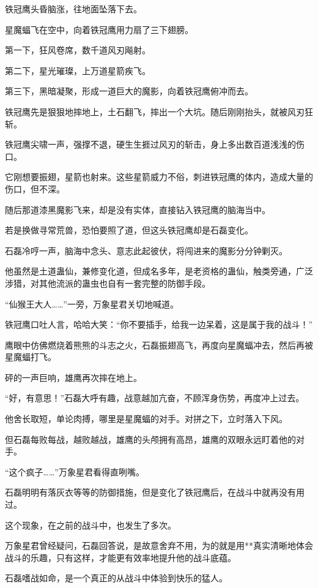 \begin{this_body}
铁冠鹰头昏脑涨，往地面坠落下去。

星魔蝠飞在空中，向着铁冠鹰用力扇了三下翅膀。

第一下，狂风卷席，数千道风刃飚射。

第二下，星光璀璨，上万道星箭疾飞。

第三下，黑暗凝聚，形成一道巨大的魔影，向着铁冠鹰俯冲而去。

铁冠鹰先是狠狠地摔地上，土石翻飞，摔出一个大坑。随后刚刚抬头，就被风刃狂斩。

铁冠鹰尖啸一声，强撑不退，硬生生捱过风刃的斩击，身上多出数百道浅浅的伤口。

它刚想要振翅，星箭也射来。这些星箭威力不俗，刺进铁冠鹰的体内，造成大量的伤口，但不深。

随后那道漆黑魔影飞来，却是没有实体，直接钻入铁冠鹰的脑海当中。

若是换做寻常荒兽，恐怕要照了道，但这头铁冠鹰却是石磊变化。

石磊冷哼一声，脑海中念头、意志此起彼伏，将闯进来的魔影分分钟剿灭。

他虽然是土道蛊仙，兼修变化道，但成名多年，是老资格的蛊仙，触类旁通，广泛涉猎，对其他流派的蛊虫也自有一套完整的防御手段。

“仙猴王大人……”一旁，万象星君关切地喊道。

铁冠鹰口吐人言，哈哈大笑：“你不要插手，给我一边呆着，这是属于我的战斗！”

鹰眼中仿佛燃烧着熊熊的斗志之火，石磊振翅高飞，再度向星魔蝠冲去，然后再被星魔蝠打飞。

砰的一声巨响，雄鹰再次摔在地上。

“好，有意思！”石磊大呼有趣，战意越加亢奋，不顾浑身伤势，再度冲上过去。

他舍长取短，单论肉搏，哪里是星魔蝠的对手。对拼之下，立时落入下风。

但石磊每败每战，越败越战，雄鹰的头颅拥有高昂，雄鹰的双眼永远盯着他的对手。

“这个疯子……”万象星君看得直咧嘴。

石磊明明有落灰衣等等的防御措施，但是变化了铁冠鹰后，在战斗中就再没有用过。

这个现象，在之前的战斗中，也发生了多次。

万象星君曾经疑问，石磊回答说，是故意舍弃不用，为的就是用**真实清晰地体会战斗的乐趣，只有这样，才能更有效率地提升他的战斗底蕴。

石磊嗜战如命，是一个真正的从战斗中体验到快乐的猛人。


\end{this_body}
